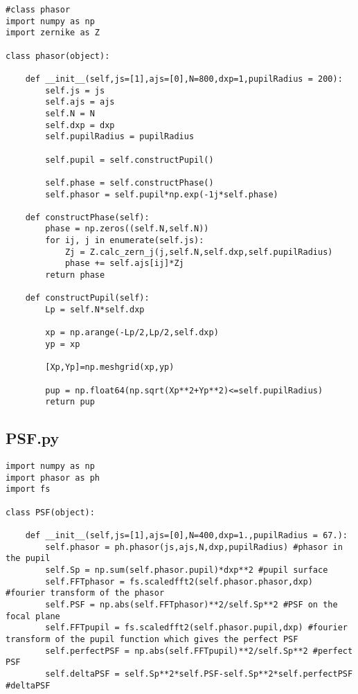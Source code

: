 \begin{lstlisting}
#class phasor
import numpy as np
import zernike as Z

class phasor(object):

    def __init__(self,js=[1],ajs=[0],N=800,dxp=1,pupilRadius = 200):
        self.js = js
        self.ajs = ajs
        self.N = N
        self.dxp = dxp
        self.pupilRadius = pupilRadius
        
        self.pupil = self.constructPupil()
        
        self.phase = self.constructPhase()
        self.phasor = self.pupil*np.exp(-1j*self.phase)

    def constructPhase(self):
        phase = np.zeros((self.N,self.N))
        for ij, j in enumerate(self.js):
            Zj = Z.calc_zern_j(j,self.N,self.dxp,self.pupilRadius)
            phase += self.ajs[ij]*Zj
        return phase
        
    def constructPupil(self):
        Lp = self.N*self.dxp

        xp = np.arange(-Lp/2,Lp/2,self.dxp)
        yp = xp

        [Xp,Yp]=np.meshgrid(xp,yp)
        
        pup = np.float64(np.sqrt(Xp**2+Yp**2)<=self.pupilRadius)
        return pup

\end{lstlisting}

\subsection{PSF.py}
\label{subapp:PSF}

\begin{lstlisting}
import numpy as np
import phasor as ph
import fs

class PSF(object):

    def __init__(self,js=[1],ajs=[0],N=400,dxp=1.,pupilRadius = 67.):
        self.phasor = ph.phasor(js,ajs,N,dxp,pupilRadius) #phasor in the pupil
        self.Sp = np.sum(self.phasor.pupil)*dxp**2 #pupil surface
        self.FFTphasor = fs.scaledfft2(self.phasor.phasor,dxp) #fourier transform of the phasor
        self.PSF = np.abs(self.FFTphasor)**2/self.Sp**2 #PSF on the focal plane
        self.FFTpupil = fs.scaledfft2(self.phasor.pupil,dxp) #fourier transform of the pupil function which gives the perfect PSF
        self.perfectPSF = np.abs(self.FFTpupil)**2/self.Sp**2 #perfect PSF
        self.deltaPSF = self.Sp**2*self.PSF-self.Sp**2*self.perfectPSF #deltaPSF
\end{lstlisting}

